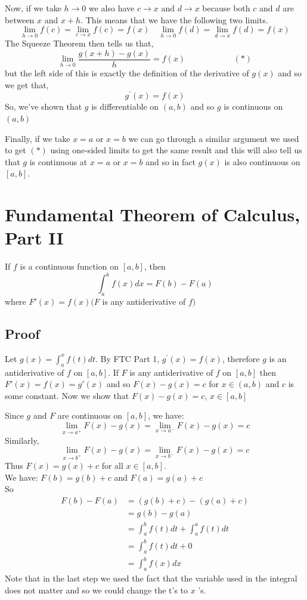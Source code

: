 \documentclass[10pt]{article}
\begin{document}
Now, if we take $h \rightarrow 0$ we also have $c \rightarrow x$ and $d \rightarrow x$ because both $c$ and $d$ are between $x$ and $x+h$. This means that we have the following two limits.
$$
\lim _{h \rightarrow 0} f(c)=\lim _{c \rightarrow x} f(c)=f(x)  
 \quad \lim _{h \rightarrow 0} f(d)=\lim _{d \rightarrow x} f(d)=f(x)
$$
The Squeeze Theorem then tells us that,
$$
    \lim _{h \rightarrow 0} \frac{g(x+h)-g(x)}{h}=f(x)     \ \ \ \ \ \ \ \ \ \ \ \ \ \ \ \ \ \ \ \ \ \ \ \ \ \ (*)
$$
but the left side of this is exactly the definition of the derivative of $g(x)$ and so we get that,
$$
g^{\prime}(x)=f(x)
$$
So, we've shown that $g$ is differentiable on $(a, b)$ and so $g$ is continuous on $(a,b)$

Finally, if we take $x=a$ or $x=b$ we can go through a similar argument we used to get $(*)$ using one-sided limits to get the same result and this will also tell us that $g$ is continuous at $x=a$ or $x=b$ and so in fact $g(x)$ is also continuous on $[a, b]$.

\section{Fundamental Theorem of Calculus, Part II}
If $f$ is a continuous function on $[a, b]$, then
$$
\int_{a}^{b} f(x) d x=F(b)-F(a)
$$
where  $F'(x) =f(x) (F$ is any antiderivative of $f)$

\subsection{Proof}
Let $g(x)=\int_{a}^{x} f(t) d t$. By FTC Part 1, $g^{\prime}(x)=f(x)$, therefore $g$ is an antiderivative of $f$ on $[a, b]$. If $F$ is any antiderivative of $f$ on $[a, b]$ then $F' (x)=f(x)=g'(x)$ and so $F(x)-g(x)=c$ for $x\in (a,b)$ and $c$ is some constant. Now we show that $F(x)-g(x)=c$, $x \in [a,b]$

Since $g$ and $F$ are continuous on $[a, b]$, we have:
$$
\lim _{x \to a^+} F(x)-g(x) =\lim _{x \to a^-} F(x)-g(x)=c
$$
Similarly,
$$
\lim _{x \to b^+} F(x)-g(x) =\lim _{x \to b^-} F(x)-g(x)=c
$$
Thus $F(x)=g(x) +c$ for all $x\in [a,b]$.\\
We have: $F(b) = g(b) + c$ and $F(a) = g(a) + c$\\
So
$$
\begin{aligned}
F(b)-F(a) &=(g(b)+c)-(g(a)+c) \\
&=g(b)-g(a) \\
&=\int_{a}^{b} f(t) d t+\int_{a}^{a} f(t) d t \\
&=\int_{a}^{b} f(t) d t+0 \\
&=\int_{a}^{b} f(x) d x
\end{aligned}
$$
Note that in the last step we used the fact that the variable used in the integral does not matter and so we could change the t's to $x$ 's.
\end{document}
